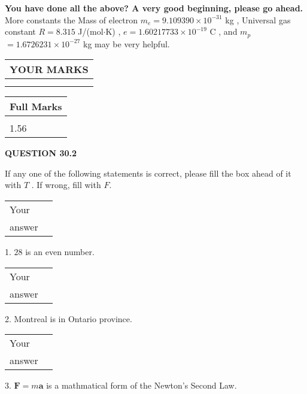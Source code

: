 \documentclass[12pt]{article}
\begin{document}
   
\vspace{0.3in}
{\textbf{\LARGE{You have done all the above? A very good beginning, please go ahead.}}}
More constants the
Mass of electron
$m_e$$ =
9.109390 \times 10^{-31} $
kg
,
Universal gas constant
$R$$ =
8.315 $
J/(mol$\cdot $K)
,
$e$$ =
1.60217733 \times 10^{-19} $
C
, and
$m_p$$ =
1.6726231 \times 10^{-27} $
kg
%
may be very helpful.
\vspace{0.3in}
   
   
  
\vspace{0.2in}
  
\noindent\begin{tabular}{|l|}
\hline
 YOUR MARKS  \\
\hline
 \\ 
 \\ 
\hline
\end{tabular}
\hspace{0.05in} \begin{tabular}{|l|}
\hline
 Full Marks  \\
\hline
 \\ 
1.56 \\
\hline
\end{tabular}
{\textbf{\Large{QUESTION
30.2 
}}}
  
  
If any one of the following statements is correct, please fill the box ahead of it with $T$ .
If wrong, fill with $F$.
 
\noindent\begin{tabular}{|l|l|}\hline Your&\hspace{.2in} \\ answer&\hspace{.2in} \\ \hline \end{tabular}
1. $ %
28$ is an  %
even number.
 
\noindent\begin{tabular}{|l|l|}\hline Your&\hspace{.2in} \\ answer&\hspace{.2in} \\ \hline \end{tabular}
2.  %
Montreal is in  %
Ontario province.
 
\noindent\begin{tabular}{|l|l|}\hline Your&\hspace{.2in} \\ answer&\hspace{.2in} \\ \hline \end{tabular}
3.  %
$\mathbf{F}=m\mathbf{a}$ is a mathmatical form of
the Newton's Second Law.
 
\end{document}
